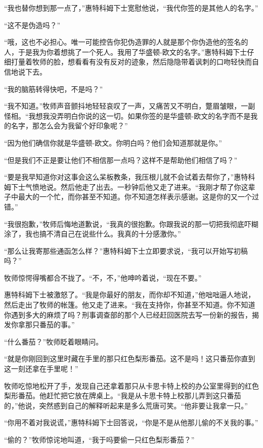     “我也替你想到那一点了，”惠特科姆下士宽慰他说，“我代你签的是其他人的名字。”

    “这不是伪造吗？”

    “哦，这也不必担心。唯一可能控告你犯伪造罪的人就是那个你伪造他的签名的人，于是我为你着想挑了一个死人。我用了华盛顿-欧文的名字。”惠特科姆下士仔细打量着牧师的脸，想看看有没有反对的迹象，然后隐隐带着讽刺的口吻轻快而自信地说下去。

    “我的脑筋转得快吧，不是吗？”

    “我不知道。”牧师声音颤抖地轻轻哀叹了一声，又痛苦又不明白，蹩眉皱眼，一副怪相。“我想我没弄明白你说的这一切。如果你签的是华盛顿-欧文的名字而不是我的名字，那怎么会为我留个好印象呢？”

    “因为他们确信你就是华盛顿-欧文。你明白吗？他们会知道那就是你。”

    “但是我们不正是要让他们不相信那一点吗？这样不是帮助他们相信了吗？”

    “要是我早知道你对这事会这么呆板教条，我压根儿就不会试着去帮你了，”惠特科姆下士气愤地说。然后他走了出去。一秒钟后他又走了进来。“我刚才帮了你这辈子中最大的一个忙，而你甚至不知道。你不知道怎样表示感谢。这是你的又一个过错。”

    “我很抱歉，”牧师后悔地道歉说，“我真的很抱歉。你跟我说的那一切把我彻底吓糊涂了，我也搞不清自己在说些什么。我真的十分感激你。”

    “那么让我寄那些通函怎么样？”惠特科姆下士立即要求说，“我可以开始写初稿吗？”

    牧师惊愕得嘴都合不拢了。“不，不，”他呻吟着说，“现在不要。”

    惠特科姆下士被激怒了。“我是你最好的朋友，而你却不知道，”他咄咄逼人地说，然后走出了牧师的帐篷。他又走了进来。“我在支持你，你甚至不知道。你不知道你遇到多大的麻烦了吗？刑事调查部的那个人已经赶回医院去写一份新的报告，揭发你拿那只番茄的事。”

    “什么番茄？”牧师眨着眼睛问。

    “就是你刚回到这里时藏在手里的那只红色梨形番茄。这不是吗！这只番茄你直到这一刻还拿在手里呢！”

    牧师吃惊地松开了手，发现自己还拿着那只从卡思卡特上校的办公室里得到的红色梨形番茄。他赶忙把它放在牌桌上。“我是从卡思卡特上校那儿弄到这只番茄的，”他说，突然惑到自己的解释听起来是多么荒唐可笑。“他非要让我拿一只。”

    “你用不着对我说谎，”惠特科姆下士回答说，“你是不是从他那儿偷的不关我的事。”

    “偷的？”牧师惊诧地叫道，“我于吗要偷一只红色梨形番茄？”

